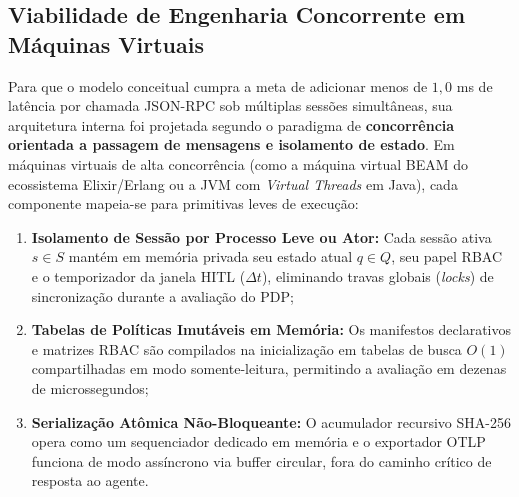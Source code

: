 \subsection{Viabilidade de Engenharia Concorrente em Máquinas Virtuais}
\label{subsec:engenharia_concorrente_vm}

Para que o modelo conceitual cumpra a meta de adicionar menos de $1{,}0$ ms de latência por chamada JSON-RPC sob múltiplas sessões simultâneas, sua arquitetura interna foi projetada segundo o paradigma de \textbf{concorrência orientada a passagem de mensagens e isolamento de estado}. Em máquinas virtuais de alta concorrência (como a máquina virtual BEAM do ecossistema Elixir/Erlang ou a JVM com \textit{Virtual Threads} em Java), cada componente mapeia-se para primitivas leves de execução:
\begin{enumerate}
  \item \textbf{Isolamento de Sessão por Processo Leve ou Ator:} Cada sessão ativa $s \in S$ mantém em memória privada seu estado atual $q \in Q$, seu papel RBAC e o temporizador da janela HITL ($\Delta t$), eliminando travas globais (\textit{locks}) de sincronização durante a avaliação do PDP;
  \item \textbf{Tabelas de Políticas Imutáveis em Memória:} Os manifestos declarativos e matrizes RBAC são compilados na inicialização em tabelas de busca $O(1)$ compartilhadas em modo somente-leitura, permitindo a avaliação em dezenas de microssegundos;
  \item \textbf{Serialização Atômica Não-Bloqueante:} O acumulador recursivo SHA-256 opera como um sequenciador dedicado em memória e o exportador OTLP funciona de modo assíncrono via buffer circular, fora do caminho crítico de resposta ao agente.
\end{enumerate}
